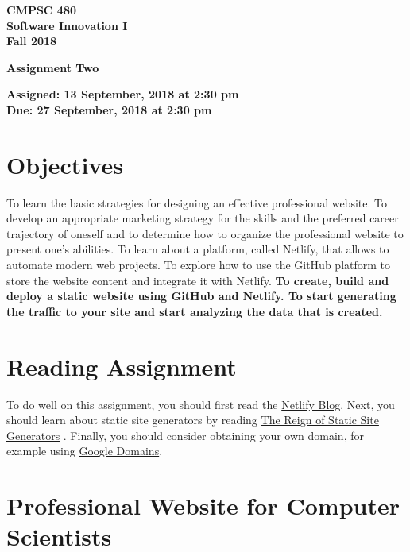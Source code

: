 \documentclass[11pt]{article}
\newcommand{\assignmentduedate}{27 September}
\newcommand{\assignmentassignedate}{ 13 September}
\newcommand{\assignmentnumber}{Two}
\newcommand{\labyear}{2018}
\newcommand{\labtime}{2:30 pm}
\newcommand{\assigneddate}{Assigned:  \assignmentassignedate, \labyear{} at \labtime{}}
\newcommand{\duedate}{Due:  \assignmentduedate, \labyear{} at \labtime{}}
\newcommand{\labtitle}[1]
{
  \begin{center}
    \begin{center}
      \bf
      CMPSC 480 \\ Software Innovation I\\
      Fall 2018\\
      \medskip
    \end{center}
    \bf
    #1
  \end{center}
}
\begin{document}
\thispagestyle{empty}

\labtitle{Assignment \assignmentnumber{} }
\begin{center} \textbf{ \assigneddate{} \\ \duedate{} } \end{center} 
\noindent \textbf{ }

\vspace{-0.05in}
\section*{Objectives}

To learn the basic strategies for designing an effective professional website. To develop an appropriate marketing strategy for the skills and the preferred career trajectory of oneself and to determine how to organize the professional website to present one's abilities. To learn about a platform, called Netlify, that allows to automate modern web projects. To explore how to use the GitHub platform to store the website content and integrate it with Netlify. \textbf{To create, build and deploy a static website using GitHub and Netlify. To start generating the traffic to your site and start analyzing the data that is created. }

\vspace{-0.05in}
\section*{Reading Assignment}

To do well on this assignment, you
should first read the \href{https://www.netlify.com/blog/}{Netlify Blog}. 
Next, you should learn about static site generators by reading \href{https://www.netlify.com/blog/2018/07/12/the-reign-of-static-site-generators-/}{The Reign of Static Site Generators} .
Finally, you should consider obtaining your own domain, for example using \href{https://domains.google/#/}{Google Domains}.

\vspace{-0.05in}
\section*{Professional Website for Computer Scientists}
\end{document}
